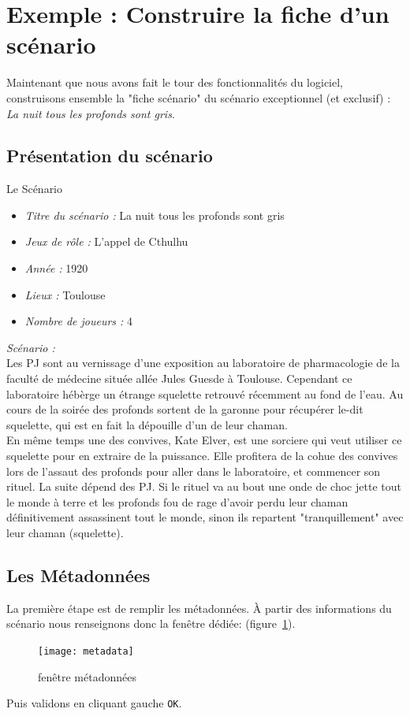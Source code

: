 \documentclass[a4paper,12pt]{article}
\newcommand*{\interfaceitem}[1]{\texttt{#1}}
\begin{document}
\section{Exemple : Construire la fiche d'un scénario}
\label{sec:exem}

Maintenant que nous avons fait le tour des fonctionnalités du logiciel, construisons ensemble la "fiche scénario" du scénario exceptionnel (et exclusif) : \emph{La nuit tous les profonds sont gris}.

\subsection{Présentation du scénario}
\label{exemple_scenario}
Le Scénario
\begin{itemize}
    \item \emph{Titre du scénario :} La nuit tous les profonds sont gris
    \item \emph{Jeux de rôle :} L'appel de Cthulhu
    \item \emph{Année :} 1920
    \item \emph{Lieux :} Toulouse
    \item \emph{Nombre de joueurs : } 4
\end{itemize}

\emph{Scénario :}\\ 
Les PJ sont au vernissage d'une exposition au laboratoire de pharmacologie de la faculté de médecine située allée Jules Guesde à Toulouse. Cependant ce laboratoire hébèrge  un étrange squelette retrouvé récemment au fond de l'eau. Au cours de la soirée des profonds sortent de la garonne pour récupérer le-dit squelette, qui est en fait la dépouille d'un de leur chaman.
\\
En même temps une des convives, Kate Elver, est une sorciere qui veut utiliser ce squelette pour en extraire de la puissance. Elle profitera de la cohue des convives lors de l'assaut des profonds pour aller dans le laboratoire, et commencer son rituel. La suite dépend des PJ. Si le rituel va au bout une onde de choc jette tout le monde à terre et les profonds fou de rage d'avoir perdu leur chaman définitivement assassinent tout le monde, sinon ils repartent "tranquillement" avec leur chaman (squelette).

\subsection{Les Métadonnées}
La première étape est de remplir les métadonnées. À partir des informations du scénario nous renseignons donc la fenêtre dédiée: (figure~\ref{metadata}).
\begin{figure}[h!]
    \texttt{[image: metadata]}
    \caption{fenêtre métadonnées}
    \label{metadata}
\end{figure}
Puis validons en cliquant gauche \interfaceitem{OK}.
\end{document}
